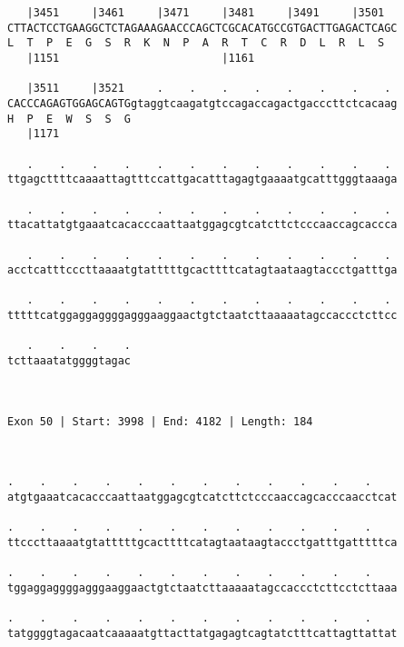 \documentclass{article}
\begin{document}
\begin{Verbatim}
   |3451     |3461     |3471     |3481     |3491     |3501  
CTTACTCCTGAAGGCTCTAGAAAGAACCCAGCTCGCACATGCCGTGACTTGAGACTCAGC
L  T  P  E  G  S  R  K  N  P  A  R  T  C  R  D  L  R  L  S  
   |1151                         |1161                      
  
   |3511     |3521     .    .    .    .    .    .    .    . 
CACCCAGAGTGGAGCAGTGgtaggtcaagatgtccagaccagactgacccttctcacaag
H  P  E  W  S  S  G                                         
   |1171                                                    
  
   .    .    .    .    .    .    .    .    .    .    .    . 
ttgagcttttcaaaattagtttccattgacatttagagtgaaaatgcatttgggtaaaga
                                                            
   .    .    .    .    .    .    .    .    .    .    .    . 
ttacattatgtgaaatcacacccaattaatggagcgtcatcttctcccaaccagcaccca
                                                            
   .    .    .    .    .    .    .    .    .    .    .    . 
acctcatttcccttaaaatgtatttttgcacttttcatagtaataagtaccctgatttga
                                                            
   .    .    .    .    .    .    .    .    .    .    .    . 
tttttcatggaggaggggagggaaggaactgtctaatcttaaaaatagccaccctcttcc
                                                            
   .    .    .    .
tcttaaatatggggtagac
                   
                   
 
Exon 50 | Start: 3998 | End: 4182 | Length: 184



.    .    .    .    .    .    .    .    .    .    .    .    
atgtgaaatcacacccaattaatggagcgtcatcttctcccaaccagcacccaacctcat
                                                            
.    .    .    .    .    .    .    .    .    .    .    .    
ttcccttaaaatgtatttttgcacttttcatagtaataagtaccctgatttgatttttca
                                                            
.    .    .    .    .    .    .    .    .    .    .    .    
tggaggaggggagggaaggaactgtctaatcttaaaaatagccaccctcttcctcttaaa
                                                            
.    .    .    .    .    .    .    .    .    .    .    .    
tatggggtagacaatcaaaaatgttacttatgagagtcagtatctttcattagttattat
                                                            

\end{Verbatim}
\end{document}
